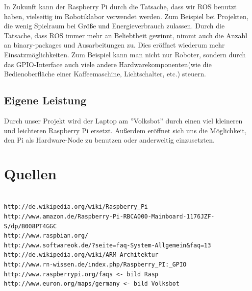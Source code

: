 \documentclass[12pt]{article}
\begin{document}
In Zukunft kann der Raspberry Pi durch die Tatsache, dass wir ROS benutzt haben, vielseitig im Robotiklabor verwendet werden. Zum Beispiel bei Projekten, die wenig Spielraum bei Größe und Energieverbrauch zulassen.
Durch die Tatsache, dass ROS immer mehr an Beliebtheit gewinnt, nimmt auch die Anzahl an binary-packages und Ausarbeitungen zu. Dies eröffnet wiederum mehr Einsatzmöglichkeiten.
Zum Beispiel kann man nicht nur Roboter, sondern durch das GPIO-Interface auch viele andere Hardwarekomponenten(wie die Bedienoberfläche einer Kaffeemaschine, Lichtschalter, etc.) steuern.  


\subsection{Eigene Leistung}

Durch unser Projekt wird der Laptop am ''Volksbot'' durch einen viel kleineren und leichteren Raspberry Pi ersetzt. Außerdem eröffnet sich uns die Möglichkeit, den Pi als Hardware-Node zu benutzen oder anderweitig einzusetzten.

\section{Quellen}
\begin{verbatim}

http://de.wikipedia.org/wiki/Raspberry_Pi
http://www.amazon.de/Raspberry-Pi-RBCA000-Mainboard-1176JZF-S/dp/B008PT4GGC
http://www.raspbian.org/
http://www.softwareok.de/?seite=faq-System-Allgemein&faq=13
http://de.wikipedia.org/wiki/ARM-Architektur
http://www.rn-wissen.de/index.php/Raspberry_PI:_GPIO
http://www.raspberrypi.org/faqs <- bild Rasp
http://www.euron.org/maps/germany <- bild Volksbot

\end{verbatim}
\end{document}
